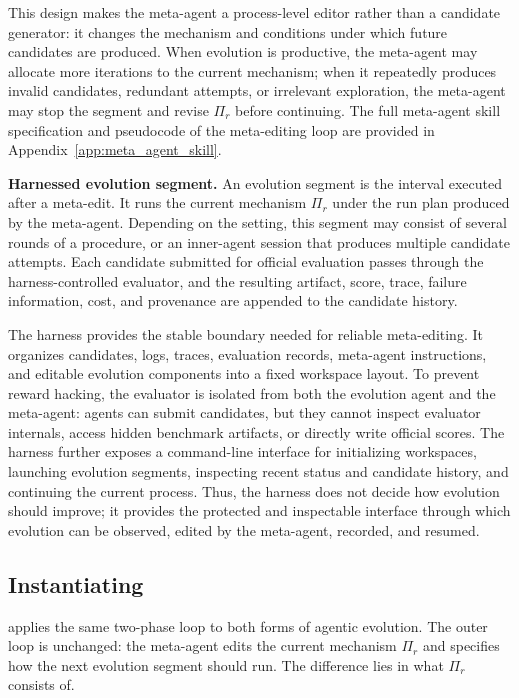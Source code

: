 This design makes the meta-agent a process-level editor rather than a candidate generator: it changes the mechanism and conditions under which future candidates are produced.
When evolution is productive, the meta-agent may allocate more iterations to the current mechanism; when it repeatedly produces invalid candidates, redundant attempts, or irrelevant exploration, the meta-agent may stop the segment and revise $\Pi_r$ before continuing.
The full meta-agent skill specification and pseudocode of the meta-editing loop are provided in Appendix~\ref{app:meta_agent_skill}.

\textbf{Harnessed evolution segment.}
An evolution segment is the interval executed after a meta-edit.
It runs the current mechanism $\Pi_r$ under the run plan produced by the meta-agent.
Depending on the setting, this segment may consist of several rounds of a procedure, or an inner-agent session that produces multiple candidate attempts.
Each candidate submitted for official evaluation passes through the harness-controlled evaluator, and the resulting artifact, score, trace, failure information, cost, and provenance are appended to the candidate history.

The harness provides the stable boundary needed for reliable meta-editing.
It organizes candidates, logs, traces, evaluation records, meta-agent instructions, and editable evolution components into a fixed workspace layout.
To prevent reward hacking, the evaluator is isolated from both the evolution agent and the meta-agent: agents can submit candidates, but they cannot inspect evaluator internals, access hidden benchmark artifacts, or directly write official scores.
The harness further exposes a command-line interface for initializing workspaces, launching evolution segments, inspecting recent status and candidate history, and continuing the current process.
Thus, the harness does not decide how evolution should improve; it provides the protected and inspectable interface through which evolution can be observed, edited by the meta-agent, recorded, and resumed.

\subsection{Instantiating \method}
\label{sec:instantiation}

\method applies the same two-phase loop to both forms of agentic evolution.
The outer loop is unchanged: the meta-agent edits the current mechanism $\Pi_r$ and specifies how the next evolution segment should run.
The difference lies in what $\Pi_r$ consists of.

